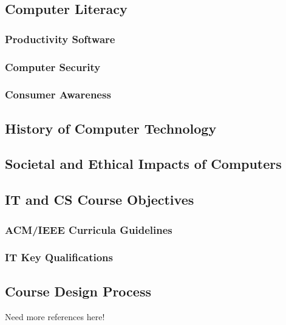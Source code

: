 \subsection{Computer Literacy}

\subsubsection{Productivity Software}

\subsubsection{Computer Security}

\subsubsection{Consumer Awareness}

\subsection{History of Computer Technology}

\subsection{Societal and Ethical Impacts of Computers}

\subsection{IT and CS Course Objectives}

\subsubsection{ACM/IEEE Curricula Guidelines}

\subsubsection{IT Key Qualifications}

\subsection{Course Design Process}

Need more references here!